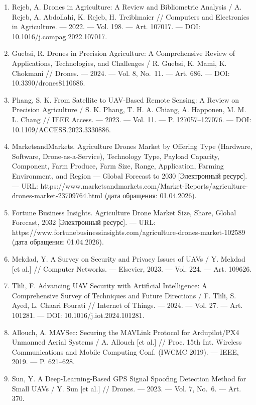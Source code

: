\documentclass[14pt,a4paper]{extarticle}
\begin{document}
\begin{enumerate}
\def\labelenumi{\arabic{enumi}.}
\item
  Rejeb, A. Drones in Agriculture: A Review and Bibliometric Analysis / A. Rejeb, A. Abdollahi, K. Rejeb, H. Treiblmaier // Computers and Electronics in Agriculture. --- 2022. --- Vol. 198. --- Art. 107017. --- DOI: 10.1016/j.compag.2022.107017.
\item
  Guebsi, R. Drones in Precision Agriculture: A Comprehensive Review of Applications, Technologies, and Challenges / R. Guebsi, K. Mami, K. Chokmani // Drones. --- 2024. --- Vol. 8, No.~11. --- Art. 686. --- DOI: 10.3390/drones8110686.
\item
  Phang, S. K. From Satellite to UAV-Based Remote Sensing: A Review on Precision Agriculture / S. K. Phang, T. H. A. Chiang, A. Happonen, M. M. L. Chang // IEEE Access. --- 2023. --- Vol. 11. --- P. 127057--127076. --- DOI: 10.1109/ACCESS.2023.3330886.
\item
  MarketsandMarkets. Agriculture Drones Market by Offering Type (Hardware, Software, Drone-as-a-Service), Technology Type, Payload Capacity, Component, Farm Produce, Farm Size, Range, Application, Farming Environment, and Region --- Global Forecast to 2030 {[}Электронный ресурс{]}. --- URL: https://www.marketsandmarkets.com/Market-Reports/agriculture-drones-market-23709764.html (дата обращения: 01.04.2026).
\item
  Fortune Business Insights. Agriculture Drone Market Size, Share, Global Forecast, 2032 {[}Электронный ресурс{]}. --- URL: https://www.fortunebusinessinsights.com/agriculture-drones-market-102589 (дата обращения: 01.04.2026).
\item
  Mekdad, Y. A Survey on Security and Privacy Issues of UAVs / Y. Mekdad {[}et al.{]} // Computer Networks. --- Elsevier, 2023. --- Vol. 224. --- Art. 109626.
\item
  Tlili, F. Advancing UAV Security with Artificial Intelligence: A Comprehensive Survey of Techniques and Future Directions / F. Tlili, S. Ayed, L. Chaari Fourati // Internet of Things. --- 2024. --- Vol. 27. --- Art. 101281. --- DOI: 10.1016/j.iot.2024.101281.
\item
  Allouch, A. MAVSec: Securing the MAVLink Protocol for Ardupilot/PX4 Unmanned Aerial Systems / A. Allouch {[}et al.{]} // Proc. 15th Int. Wireless Communications and Mobile Computing Conf. (IWCMC 2019). --- IEEE, 2019. --- P. 621--628.
\item
  Sun, Y. A Deep-Learning-Based GPS Signal Spoofing Detection Method for Small UAVs / Y. Sun {[}et al.{]} // Drones. --- 2023. --- Vol. 7, No.~6. --- Art. 370.

\end{enumerate}
\end{document}
